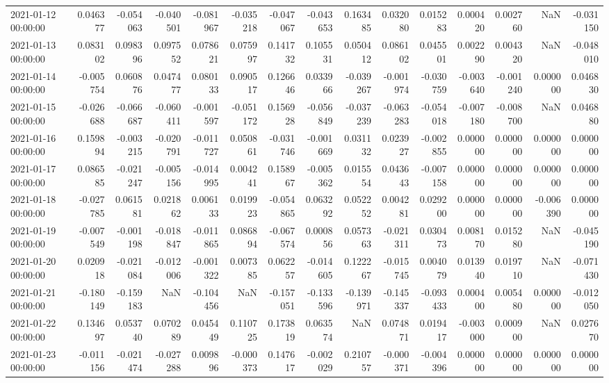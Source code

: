 \begin{tabular}{lrrrrrrrrrrrrrr}
2021-01-12 00:00:00 & 0.046377 & -0.054063 & -0.040501 & -0.081967 & -0.035218 & -0.047067 & -0.043653 & 0.163485 & 0.032080 & 0.015283 & 0.000420 & 0.002760 & NaN & -0.031150 \\
2021-01-13 00:00:00 & 0.083102 & 0.098396 & 0.097552 & 0.078621 & 0.075997 & 0.141732 & 0.105531 & 0.050412 & 0.086102 & 0.045501 & 0.002290 & 0.004320 & NaN & -0.048010 \\
2021-01-14 00:00:00 & -0.005754 & 0.060876 & 0.047477 & 0.080133 & 0.090517 & 0.126646 & 0.033966 & -0.039267 & -0.001974 & -0.030759 & -0.003640 & -0.001240 & 0.000000 & 0.046830 \\
2021-01-15 00:00:00 & -0.026688 & -0.066687 & -0.060411 & -0.001597 & -0.051172 & 0.156928 & -0.056849 & -0.037239 & -0.063283 & -0.054018 & -0.007180 & -0.008700 & NaN & 0.046880 \\
2021-01-16 00:00:00 & 0.159894 & -0.003215 & -0.020791 & -0.011727 & 0.050861 & -0.031746 & -0.001669 & 0.031132 & 0.023927 & -0.002855 & 0.000000 & 0.000000 & 0.000000 & 0.000000 \\
2021-01-17 00:00:00 & 0.086585 & -0.021247 & -0.005156 & -0.014995 & 0.004241 & 0.158967 & -0.005362 & 0.015554 & 0.043643 & -0.007158 & 0.000000 & 0.000000 & 0.000000 & 0.000000 \\
2021-01-18 00:00:00 & -0.027785 & 0.061581 & 0.021862 & 0.006133 & 0.019923 & -0.054865 & 0.063292 & 0.052252 & 0.004281 & 0.029200 & 0.000000 & 0.000000 & -0.006390 & 0.000000 \\
2021-01-19 00:00:00 & -0.007549 & -0.001198 & -0.018847 & -0.011865 & 0.086894 & -0.067574 & 0.000856 & 0.057363 & -0.021311 & 0.030473 & 0.008170 & 0.015280 & NaN & -0.045190 \\
2021-01-20 00:00:00 & 0.020918 & -0.021084 & -0.012006 & -0.001322 & 0.007385 & 0.062257 & -0.014605 & 0.122267 & -0.015745 & 0.004079 & 0.013940 & 0.019710 & NaN & -0.071430 \\
2021-01-21 00:00:00 & -0.180149 & -0.159183 & NaN & -0.104456 & NaN & -0.157051 & -0.133596 & -0.139971 & -0.145337 & -0.093433 & 0.000400 & 0.005480 & 0.000000 & -0.012050 \\
2021-01-22 00:00:00 & 0.134697 & 0.053740 & 0.070289 & 0.045449 & 0.110725 & 0.173819 & 0.063574 & NaN & 0.074871 & 0.019417 & -0.003000 & 0.000900 & NaN & 0.027670 \\
2021-01-23 00:00:00 & -0.011156 & -0.021474 & -0.027288 & 0.009896 & -0.000373 & 0.147617 & -0.002029 & 0.210757 & -0.000371 & -0.004396 & 0.000000 & 0.000000 & 0.000000 & 0.000000 \\

\end{tabular}
